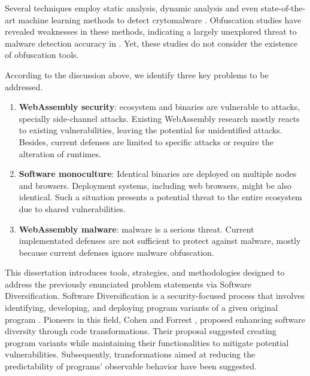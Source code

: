 Several techniques employ static analysis, dynamic analysis and even state-of-the-art machine learning methods to detect \Wasm crytomalware \cite{Minesweeper,MinerRay,MINOS,SEISMIC,RAPID,Outguard}.
Obfuscation studies have revealed weaknesses in these methods, indicating a largely unexplored threat to malware detection accuracy in \Wasm.
Yet, these studies do not consider the existence of obfuscation tools.









According to the discussion above, we identify three key problems to be addressed.

\begin{enumerate}[label=\textbf{Ps\arabic*}, ref=C\arabic*]

	\item \label{prob4} \textbf{WebAssembly security}: \Wasm ecosystem and binaries are vulnerable to attacks, specially side-channel attacks. Existing WebAssembly research mostly reacts to existing vulnerabilities, leaving the potential for unidentified attacks.
	Besides, current defenses are limited to specific attacks or require the alteration of runtimes. 
	
	\item \label{prob2} \textbf{Software monoculture}: 
	Identical \Wasm binaries are deployed on multiple nodes and browsers. 
	Deployment systems, including web browsers, might be also identical. 
	Such a situation presents a potential threat to the entire ecosystem due to shared vulnerabilities.
	 
	\item \label{prob5} \textbf{WebAssembly malware}: \Wasm malware is a serious threat. Current implementated defenses are not sufficient to protect against \Wasm malware, mostly because current defenses ignore malware obfuscation.

\end{enumerate}


\begin{comment}
\msection{Problem statement}

\end{comment}


This dissertation introduces tools, strategies, and methodologies designed to address the previously enunciated problem statements via Software Diversification.
Software Diversification is a security-focused process that involves identifying, developing, and deploying program variants of a given original program \cite{okhravi2013survey}.
Pioneers in this field, Cohen \etal \cite{cohen1993operating} and Forrest \etal \cite{595185}, proposed enhancing software diversity through code transformations. 
Their proposal suggested creating program variants while maintaining their functionalities to mitigate potential vulnerabilities.
Subsequently, transformations aimed at reducing the predictability of programs' observable behavior have been suggested. 

